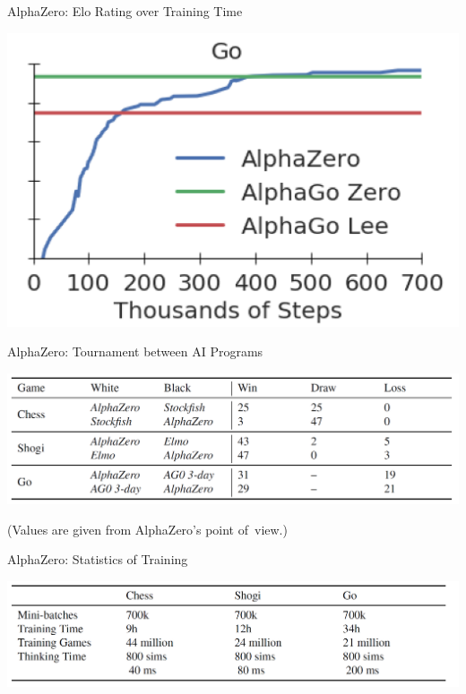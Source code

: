 \documentclass{beamer}
\begin{document}
{\begin{frame}{AlphaZero: Elo Rating over Training Time}
\begin{center}
        \pause
        \includegraphics[height=.4\textheight]{../img/AlphaZero-paper/elo-vs-training-go.png}
      \end{center}
    \end{frame}

    \begin{frame}{AlphaZero: Tournament between AI Programs}
      \begin{center}
        \includegraphics[width=\textwidth]{../img/AlphaZero-paper/tournament-evaluation.png}
      \end{center}

      {\tiny (Values are given from AlphaZero's point of~view.)}
    \end{frame}

    \begin{frame}{AlphaZero: Statistics of Training}
      \begin{center}
        \includegraphics[width=\textwidth]{../img/AlphaZero-paper/statistics-of-AlphaZero-training.png}
      \end{center}
    \end{frame}

}
\end{document}
